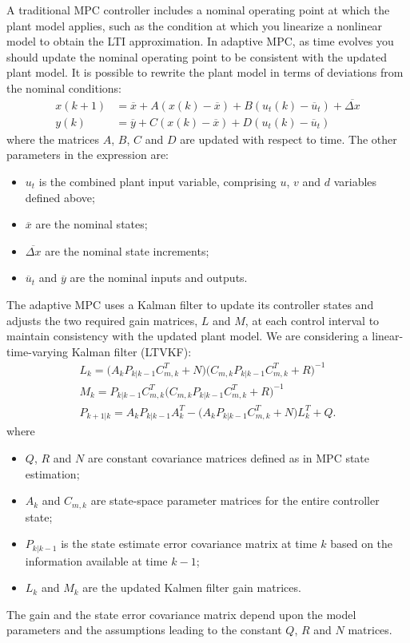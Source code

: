 \documentclass[conference, 11pt]{IEEEtran}
\begin{document}
A traditional MPC controller includes a nominal operating point at which the plant model applies, such as the condition at which you linearize a nonlinear model to obtain the LTI approximation. In adaptive MPC, as time evolves you should update the nominal operating point to be consistent with the updated plant model. It is possible to rewrite the plant model in terms of deviations from the nominal conditions:
\begin{equation*}
\label{eqn:Adaptive_MPC_nominal_condition}
\begin{aligned}
x(k+1)&=\overline{x}+A(x(k)-\overline{x})+ B(u_t(k)-\overline{u}_t)+\overline{\Delta x}\\
y(k)&=\overline{y}+C(x(k)-\overline{x}) + D(u_t(k)-\overline{u}_t)
\end{aligned}
\end{equation*}
where the matrices $A$, $B$, $C$ and $D$ are updated with respect to time. The other parameters in the expression are:
\begin{itemize}
	\item $u_t$ is the combined plant input variable, comprising $u$, $v$ and $d$ variables defined above;
	\item $\overline{x}$ are the nominal states;
	\item $\overline{\Delta x}$ are the nominal state increments;
	\item $\overline{u}_t$ and $\overline{y}$ are the nominal inputs and outputs.
\end{itemize} 
The adaptive MPC uses a Kalman filter to update its controller states and adjusts the two required gain matrices, $L$ and $M$, at each control interval to maintain consistency with the updated plant model. We are considering a linear-time-varying Kalman filter (LTVKF):
\begin{equation*}
\label{eqn:LTVKF}
\begin{array}{lll}
L_k=\big(A_kP_{k|k-1}C_{m,k}^{T}+N\big)\big(C_{m,k}P_{k|k-1}C_{m,k}^{T}+R\big)^{-1}\\
M_k =P_{k|k-1}C_{m,k}^{T}\big(C_{m,k}P_{k|k-1}C_{m,k}^{T}+R\big)^{-1}\\
P_{k+1|k}=A_kP_{k|k-1}A_k^{T}-\big(A_kP_{k|k-1}C_{m,k}^{T}+N\big)L_k^{T}+Q.
\end{array}
\end{equation*}
where 
\begin{itemize}
 \item $Q$, $R$ and $N$ are constant covariance matrices defined as in MPC state estimation;
 \item $A_k$ and $C_{m,k}$ are state-space parameter matrices for the entire controller state;
 \item $P_{k|k-1}$ is the state estimate error covariance matrix at time $k$ based on the information available at time $k-1$;
 \item $L_k$ and $M_k$ are the updated Kalmen filter gain matrices.
\end{itemize}
The gain and the state error covariance matrix depend upon the model parameters
and the assumptions leading to the constant $Q$, $R$ and $N$ matrices.
\end{document}
